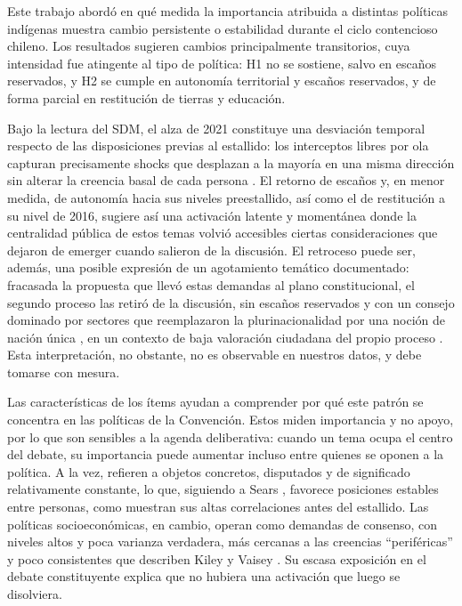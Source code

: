 \documentclass{article}
\begin{document}
Este trabajo abordó en qué medida la importancia atribuida a distintas políticas indígenas muestra cambio persistente o estabilidad durante el ciclo contencioso chileno. Los resultados sugieren cambios principalmente transitorios, cuya intensidad fue atingente al tipo de política: H1 no se sostiene, salvo en escaños reservados, y H2 se cumple en autonomía territorial y escaños reservados, y de forma parcial en restitución de tierras y educación.

Bajo la lectura del SDM, el alza de 2021 constituye una desviación temporal respecto de las disposiciones previas al estallido: los interceptos libres por ola capturan precisamente shocks que desplazan a la mayoría en una misma dirección sin alterar la creencia basal de cada persona \parencite{kiley2020}. El retorno de escaños y, en menor medida, de autonomía hacia sus niveles preestallido, así como el de restitución a su nivel de 2016, sugiere así una activación latente y momentánea donde la centralidad pública de estos temas volvió accesibles ciertas consideraciones \parencite{zaller1992} que dejaron de emerger cuando salieron de la discusión. El retroceso puede ser, además, una posible expresión de un agotamiento temático documentado: fracasada la propuesta que llevó estas demandas al plano constitucional, el segundo proceso las retiró de la discusión, sin escaños reservados y con un consejo dominado por sectores que reemplazaron la plurinacionalidad por una noción de nación única \parencite{turrachico2026,herraz2026}, en un contexto de baja valoración ciudadana del propio proceso \parencite{lazcano-pena2025,}. Esta interpretación, no obstante, no es observable en nuestros datos, y debe tomarse con mesura.

Las características de los ítems ayudan a comprender por qué este patrón se concentra en las políticas de la Convención. Estos miden importancia y no apoyo, por lo que son sensibles a la agenda deliberativa: cuando un tema ocupa el centro del debate, su importancia puede aumentar incluso entre quienes se oponen a la política. A la vez, refieren a objetos concretos, disputados y de significado relativamente constante, lo que, siguiendo a Sears \parencite*{sears1983}, favorece posiciones estables entre personas, como muestran sus altas correlaciones antes del estallido. Las políticas socioeconómicas, en cambio, operan como demandas de consenso, con niveles altos y poca varianza verdadera, más cercanas a las creencias ``periféricas'' y poco consistentes que describen Kiley y Vaisey \parencite*{kiley2020}. Su escasa exposición en el debate constituyente \parencite{suarezdelucchi2024} explica que no hubiera una activación que luego se disolviera.
\end{document}
